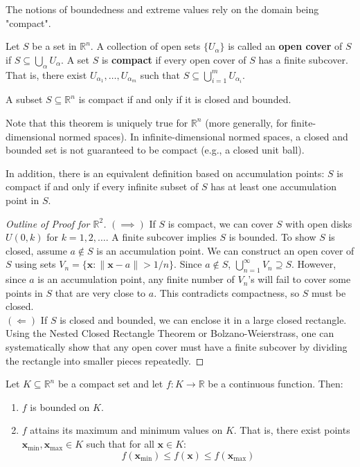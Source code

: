 The notions of boundedness and extreme values rely on the domain being "compact".

\begin{definition}
Let $S$ be a set in $\mathbb{R}^n$. A collection of open sets $\{U_\alpha\}$ is called an \textbf{open cover} of $S$ if $S \subseteq \bigcup_\alpha U_\alpha$.
A set $S$ is \textbf{compact} if every open cover of $S$ has a finite subcover. That is, there exist $U_{\alpha_1}, \dots, U_{\alpha_m}$ such that $S \subseteq \bigcup_{i=1}^m U_{\alpha_i}$.
\end{definition}

\begin{theorem}
A subset $S \subseteq \mathbb{R}^n$ is compact if and only if it is closed and bounded.
\end{theorem}
\begin{remark}
Note that this theorem is uniquely true for $\mathbb{R}^n$ (more generally, for finite-dimensional normed spaces). In infinite-dimensional normed spaces, a closed and bounded set is not guaranteed to be compact (e.g., a closed unit ball).

In addition, there is an equivalent definition based on accumulation points: $S$ is compact if and only if every infinite subset of $S$ has at least one accumulation point in $S$.
\end{remark}
\begin{proof}[Outline of Proof for $\mathbb{R}^2$]
$(\implies)$ If $S$ is compact, we can cover $S$ with open disks $U(0, k)$ for $k=1,2,\dots$. A finite subcover implies $S$ is bounded. To show $S$ is closed, assume $a \notin S$ is an accumulation point. We can construct an open cover of $S$ using sets $V_n = \{ \mathbf{x} : \|\mathbf{x} - a\| > 1/n \}$. Since $a \notin S$, $\bigcup_{n=1}^\infty V_n \supseteq S$. However, since $a$ is an accumulation point, any finite number of $V_n$'s will fail to cover some points in $S$ that are very close to $a$. This contradicts compactness, so $S$ must be closed. \\
$(\Longleftarrow)$ If $S$ is closed and bounded, we can enclose it in a large closed rectangle. Using the Nested Closed Rectangle Theorem or Bolzano-Weierstrass, one can systematically show that any open cover must have a finite subcover by dividing the rectangle into smaller pieces repeatedly.
\end{proof}

\begin{theorem}
Let $K \subseteq \mathbb{R}^n$ be a compact set and let $f: K \to \mathbb{R}$ be a continuous function. Then:
\begin{enumerate}
    \item $f$ is bounded on $K$.
    \item $f$ attains its maximum and minimum values on $K$. That is, there exist points $\mathbf{x}_{\min}, \mathbf{x}_{\max} \in K$ such that for all $\mathbf{x} \in K$:
    \[ f(\mathbf{x}_{\min}) \le f(\mathbf{x}) \le f(\mathbf{x}_{\max}) \]
\end{enumerate}
\end{theorem}

